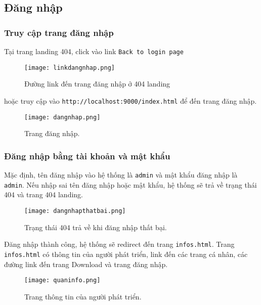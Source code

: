 \documentclass[]{article}
\begin{document}
\subsection{Đăng nhập}
\subsubsection{Truy cập trang đăng nhập}
Tại trang landing 404, click vào link \texttt{Back to login page}
\begin{figure}[H]
\centering
\texttt{[image: linkdangnhap.png]}
\caption{Đường link đến trang đăng nhập ở 404 landing}
\end{figure}
hoặc truy cập vào \texttt{http://localhost:9000/index.html} để đến trang đăng nhập.
\begin{figure}[H]
\centering
\texttt{[image: dangnhap.png]}
\caption{Trang đăng nhập.}
\end{figure}
\subsubsection{Đăng nhập bằng tài khoản và mật khẩu}
\label{login}
Mặc định, tên đăng nhập vào hệ thống là \texttt{admin} và mật khẩu đăng nhập là \texttt{admin}. Nếu nhập sai tên đăng nhập hoặc mật khẩu, hệ thống sẽ trả về trạng thái 404 và trang 404 landing.
\begin{figure}[H]
\centering
\texttt{[image: dangnhapthatbai.png]}
\caption{Trạng thái 404 trả về khi đăng nhập thất bại.}
\end{figure}
Đăng nhập thành công, hệ thống sẽ redirect đến trang \texttt{infos.html}. Trang \texttt{infos.html} có thông tin của người phát triển, link đến các trang cá nhân, các đường link đến trang Download và trang đăng nhập.
\begin{figure}[H]
\centering
\texttt{[image: quaninfo.png]}
\caption{Trang thông tin của người phát triển.}
\end{figure}
\end{document}
